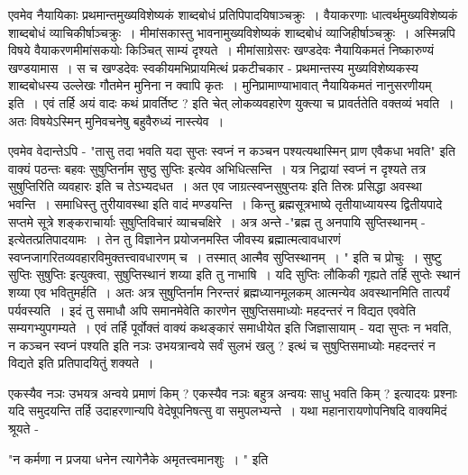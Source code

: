 {एवमेव नैयायिकाः प्रथमान्तमुख्यविशेष्यकं शाब्दबोधं प्रतिपिपादयिषाञ्चक्रुः~। वैयाकरणाः धात्वर्थमुख्यविशेष्यकं शाब्दबोधं व्याचिकीर्षाञ्चक्रुः~। मीमांसकास्तु भावनामुख्यविशेष्यकं शाब्दबोधं व्याजिहीर्षाञ्चक्रुः~। अस्मिन्नपि विषये वैयाकरणमीमांसकयोः किञ्चित् साम्यं दृश्यते~। मीमांसाग्रेसरः खण्डदेवः नैयायिकमतं निष्कारुण्यं खण्डयामास~। स च खण्डदेवः स्वकीयमभिप्रायमित्थं प्रकटीचकार - प्रथमान्तस्य मुख्यविशेष्यकस्य शाब्दबोधस्य उल्लेखः गौतमेन मुनिना न क्वापि कृतः~। मुनिप्रामाण्याभावात् नैयायिकमतं नानुसरणीयम् इति~। एवं तर्हि अयं वादः कथं प्रावर्तिष्ट ? इति चेत् लोकव्यवहारेण युक्त्या च प्रावर्ततेति वक्तव्यं भवति~। अतः विषयेऽस्मिन् मुनिवचनेषु बहुवैरुध्यं नास्त्येव~। 

एवमेव वेदान्तेऽपि - "तासु तदा भवति यदा सुप्तः स्वप्नं न कञ्चन पश्यत्यथास्मिन् प्राण एवैकधा भवति" इति वाक्यं पठन्तः बहवः सुषुप्तिर्नाम सुष्ठु सुप्तिः इत्येव अभिधित्सन्ति~। यत्र निद्रायां स्वप्नं न दृश्यते तत्र सुषुप्तिरिति व्यवहारः इति च तेऽभ्यदधत~। अत एव जाग्रत्स्वप्नसुषुप्तयः इति तिस्रः प्रसिद्धा अवस्था भवन्ति~। समाधिस्तु तुरीयावस्था इति वादं मण्डयन्ति~। किन्तु ब्रह्मसूत्रभाष्ये तृतीयाध्यायस्य द्वितीयपादे सप्तमे सूत्रे शङ्कराचार्याः सुषुप्तिविचारं व्याचचक्षिरे~। अत्र अन्ते -"ब्रह्म तु अनपायि सुप्तिस्थानम् - इत्येतत्प्रतिपादयामः~। तेन तु विज्ञानेन प्रयोजनमस्ति जीवस्य ब्रह्मात्मत्वावधारणं स्वप्नजागरितव्यवहारविमुक्तत्त्वावधारणम् च~। तस्मात् आत्मैव सुप्तिस्थानम्~। " इति च प्रोचुः~। सुष्टु सुप्तिः सुषुप्तिः इत्युक्त्वा, सुषुप्तिस्थानं शय्या इति तु नाभाषि~। यदि सुप्तिः लौकिकी गृह्यते तर्हि सुप्तेः स्थानं शय्या एव भवितुमर्हति~। अतः अत्र सुषुप्तिर्नाम निरन्तरं ब्रह्मध्यानमूलकम् आत्मन्येव अवस्थानमिति तात्पर्यं पर्यवस्यति~। इदं तु समाधौ अपि समानमेवेति कारणेन सुषुप्तिसमाध्योः महदन्तरं न विद्यत एववेति सम्यगभ्युपगम्यते~। एवं तर्हि पूर्वोक्तं वाक्यं कथङ्कारं समाधीयेत इति जिज्ञासायाम् - यदा सुप्तः न भवति, न कञ्चन स्वप्नं पश्यति इति नञः उभयत्रान्वये सर्वं सुलभं खलु ? इत्थं च सुषुप्तिसमाध्योः महदन्तरं न विद्यते इति प्रतिपादयितुं शक्यते~। 

एकस्यैव नञः उभयत्र अन्वये प्रमाणं किम् ? एकस्यैव नञः बहुत्र अन्वयः साधु भवति किम् ? इत्यादयः प्रश्नाः यदि समुदयन्ति तर्हि उदाहरणान्यपि वेदेषूपनिषत्सु वा समुपलभ्यन्ते~। यथा महानारायणोपनिषदि वाक्यमिदं श्रूयते - 

"न कर्मणा न प्रजया धनेन त्यागेनैके अमृतत्त्वमानशुः~। " इति

}
